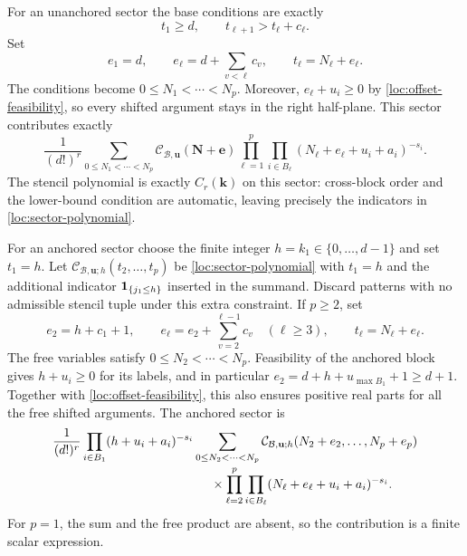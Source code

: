 For an unanchored sector the base conditions are exactly
\[
 t_1\ge d,\qquad t_{\ell+1}>t_\ell+c_\ell.
\]
Set
\begin{equation}
 e_1=d,\qquad e_\ell=d+\sum_{v<\ell}c_v,
 \qquad t_\ell=N_\ell+e_\ell.
 \label{loc:free-bases}
\end{equation}
The conditions become $0\le N_1<\cdots<N_p$.  Moreover,
$e_\ell+u_i\ge0$ by \eqref{loc:offset-feasibility}, so every shifted
argument stays in the right half-plane.  This sector contributes exactly
\begin{equation}
 \frac1{(d!)^r}
 \sum_{0\le N_1<\cdots<N_p}
       \mathcal C_{\mathcal B,\mathbf u}(\mathbf N+\mathbf e)
       \prod_{\ell=1}^p\prod_{i\in B_\ell}
                    (N_\ell+e_\ell+u_i+a_i)^{-s_i}.
 \label{loc:free-sector}
\end{equation}
The stencil polynomial is exactly $C_r(\mathbf k)$ on this sector:
cross-block order and the lower-bound condition are automatic, leaving
precisely the indicators in \eqref{loc:sector-polynomial}.

For an anchored sector choose the finite integer
$h=k_1\in\{0,\ldots,d-1\}$ and set $t_1=h$.  Let
$\mathcal C_{\mathcal B,\mathbf u;h}(t_2,\ldots,t_p)$ be
\eqref{loc:sector-polynomial} with $t_1=h$ and the additional indicator
$\mathbf 1_{\{j_1\le h\}}$ inserted in the summand.  Discard patterns with
no admissible stencil tuple under this extra constraint.  If $p\ge2$,
set
\begin{equation}
 e_2=h+c_1+1,\qquad
 e_\ell=e_2+\sum_{v=2}^{\ell-1}c_v\quad(\ell\ge3),
 \qquad t_\ell=N_\ell+e_\ell.
 \label{loc:anchored-bases}
\end{equation}
The free variables satisfy $0\le N_2<\cdots<N_p$.  Feasibility of the
anchored block gives $h+u_i\ge0$ for its labels, and in particular
$e_2=d+h+u_{\max B_1}+1\ge d+1$.  Together with
\eqref{loc:offset-feasibility}, this also ensures positive real parts for
all the free shifted arguments.  The anchored sector is
\begin{align}
 &\frac1{(d!)^r}
   \prod_{i\in B_1}(h+u_i+a_i)^{-s_i}
   \sum_{0\le N_2<\cdots<N_p}
     \mathcal C_{\mathcal B,\mathbf u;h}
                      (N_2+e_2,\ldots,N_p+e_p)
 \notag\\[-2pt]
 &\hspace{44mm}\times
       \prod_{\ell=2}^p\prod_{i\in B_\ell}
                   (N_\ell+e_\ell+u_i+a_i)^{-s_i}.
 \label{loc:anchored-sector}
\end{align}
For $p=1$, the sum and the free product are absent, so the contribution
is a finite scalar expression.

